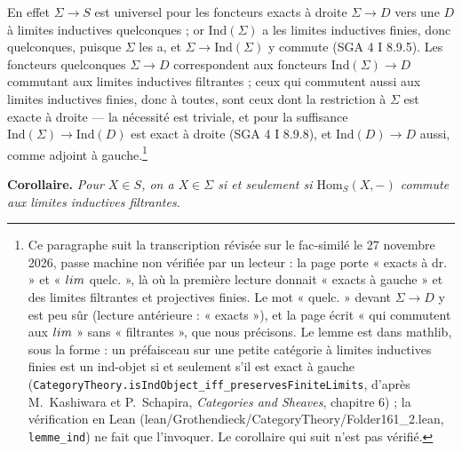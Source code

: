 \documentclass[11pt,a4paper]{article}
\begin{document}
En effet $\Sigma \to S$ est universel pour les foncteurs exacts à droite
$\Sigma \to D$ vers une $D$ à limites inductives quelconques ; or $\mathrm{Ind}
(\Sigma)$ a les limites inductives finies, donc quelconques, puisque $\Sigma$
les a, et $\Sigma \to \mathrm{Ind}(\Sigma)$ y commute (SGA 4 I 8.9.5). Les
foncteurs quelconques $\Sigma \to D$ correspondent aux foncteurs
$\mathrm{Ind}(\Sigma) \to D$ commutant aux limites inductives filtrantes ;
ceux qui commutent aussi aux limites inductives finies, donc à toutes, sont
ceux dont la restriction à $\Sigma$ est exacte à droite — la nécessité est
triviale, et pour la suffisance $\mathrm{Ind}(\Sigma) \to \mathrm{Ind}(D)$
est exact à droite (SGA 4 I 8.9.8), et $\mathrm{Ind}(D) \to D$ aussi, comme
adjoint à gauche.\footnote{Ce paragraphe suit la transcription révisée sur le
fac-similé le 27 novembre 2026, passe machine non vérifiée par un lecteur : la
page porte « exacts à dr. » et « $\varinjlim$ quelc. », là où la première
lecture donnait « exacts à gauche » et des limites filtrantes et projectives
finies. Le mot « quelc. » devant $\Sigma \to D$ y est peu sûr (lecture
antérieure : « exacts »), et la page écrit « qui commutent aux $\varinjlim$ »
sans « filtrantes », que nous précisons. Le lemme est dans mathlib, sous la
forme : un préfaisceau sur une petite catégorie à limites inductives finies
est un ind-objet si et seulement s'il est exact à gauche
(\texttt{CategoryTheory.isIndObject\_iff\_preservesFiniteLimits}, d'après
M.~Kashiwara et P.~Schapira, \emph{Categories and Sheaves}, chapitre 6) ; la
vérification en Lean (lean/Grothendieck/CategoryTheory/Folder161\_2.lean, \texttt{lemme\_ind})
ne fait que l'invoquer. Le corollaire qui suit n'est pas vérifié.}

\textbf{Corollaire.} \emph{Pour $X \in S$, on a $X \in \Sigma$ si et seulement
si $\mathrm{Hom}_{S}(X, -)$ commute aux limites inductives filtrantes.}
\end{document}
